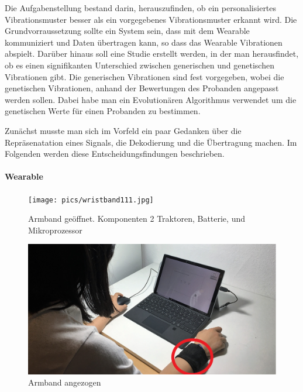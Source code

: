 
Die Aufgabenstellung bestand darin, herauszufinden, ob ein personalisiertes Vibrationsmuster besser als ein vorgegebenes Vibrationsmuster erkannt wird.
Die Grundvorraussetzung sollte ein System sein, dass mit dem Wearable kommuniziert und Daten {\"u}bertragen kann, so dass das Wearable Vibrationen abspielt. 
Dar{\"u}ber hinaus soll eine Studie erstellt werden, in der man herausfindet, ob es einen signifikanten Unterschied zwischen generischen und genetischen Vibrationen gibt. 
Die generischen Vibrationen sind fest vorgegeben, wobei die genetischen Vibrationen, anhand der Bewertungen des Probanden angepasst werden sollen. 
Dabei habe man ein Evolution{\"a}ren Algorithmus verwendet um die genetischen Werte f{\"u}r einen Probanden zu bestimmen. 

Zunächst musste man sich im Vorfeld ein paar Gedanken {\"u}ber die Repr{\"a}senatation eines Signals, die Dekodierung und die {\"U}bertragung machen.
Im Folgenden werden diese Entscheidungsfindungen beschrieben.

\paragraph{Wearable}

\begin{figure}
	\centering
    \texttt{[image: pics/wristband111.jpg]}
    \caption{Armband ge{\"o}ffnet. Komponenten 2 Traktoren, Batterie, und Mikroprozessor}
    \label{fig:wristband1}
\end{figure}

\begin{figure}
	\centering
    \includegraphics[width=\textwidth]{pics/peter.jpg}
    \caption{Armband angezogen}
    \label{fig:wristband2}
\end{figure}

